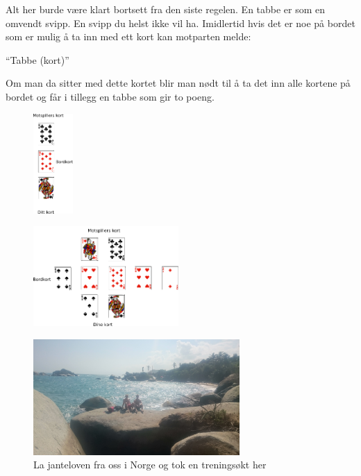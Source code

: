 Alt her burde være klart bortsett fra den siste regelen. En tabbe er
som en omvendt svipp. En svipp du helst ikke vil ha. Imidlertid hvis
det er noe på bordet som er mulig å ta inn med ett kort kan motparten
melde:
\begin{dialogue}
	\item ``Tabbe (kort)''
\end{dialogue}
Om man da sitter med dette kortet blir man nødt til å ta det inn alle
kortene på bordet og får i tillegg en tabbe som gir to poeng. 

\begin{figure}
\centering
\begin{minipage}{.3\textwidth}
  \centering
  \includegraphics[height=1.5in]{tabbenkel}
  \label{fig:test1}
\end{minipage}%
\begin{minipage}{.6\textwidth}
  \centering
  \includegraphics[height=1.5in]{avanserttabbe}
  \label{fig:test2}
\end{minipage}
\end{figure}


\begin{figure}[H]
	\centering
	\includegraphics[width=0.7\textwidth]{tayronapark}
	\caption{La janteloven fra oss i Norge og tok en treningsøkt
	her}
	\label{fig:tayronapark}
\end{figure}


